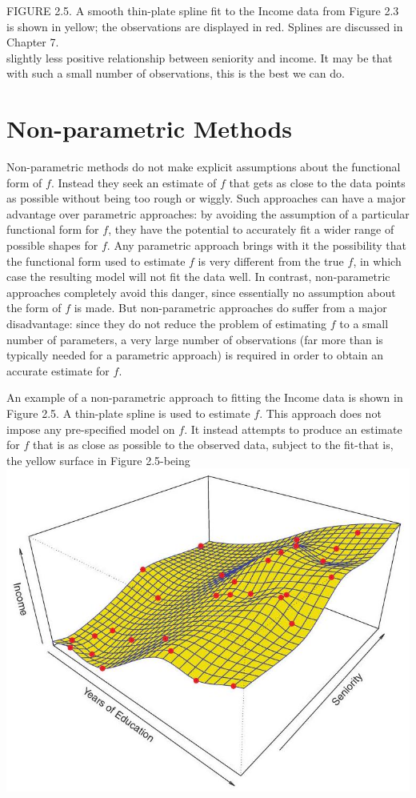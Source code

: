 \documentclass[10pt]{article}
\begin{document}
FIGURE 2.5. A smooth thin-plate spline fit to the Income data from Figure 2.3 is shown in yellow; the observations are displayed in red. Splines are discussed in Chapter 7.\\
slightly less positive relationship between seniority and income. It may be that with such a small number of observations, this is the best we can do.

\section*{Non-parametric Methods}
Non-parametric methods do not make explicit assumptions about the functional form of $f$. Instead they seek an estimate of $f$ that gets as close to the data points as possible without being too rough or wiggly. Such approaches can have a major advantage over parametric approaches: by avoiding the assumption of a particular functional form for $f$, they have the potential to accurately fit a wider range of possible shapes for $f$. Any parametric approach brings with it the possibility that the functional form used to estimate $f$ is very different from the true $f$, in which case the resulting model will not fit the data well. In contrast, non-parametric approaches completely avoid this danger, since essentially no assumption about the form of $f$ is made. But non-parametric approaches do suffer from a major disadvantage: since they do not reduce the problem of estimating $f$ to a small number of parameters, a very large number of observations (far more than is typically needed for a parametric approach) is required in order to obtain an accurate estimate for $f$.

An example of a non-parametric approach to fitting the Income data is shown in Figure 2.5. A thin-plate spline is used to estimate $f$. This approach does not impose any pre-specified model on $f$. It instead attempts to produce an estimate for $f$ that is as close as possible to the observed data, subject to the fit-that is, the yellow surface in Figure 2.5-being\\
\includegraphics[max width=\textwidth, center]{2025_05_05_efe77898333945044de4g-039}
\end{document}

